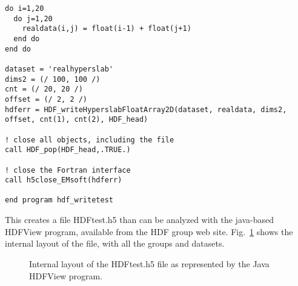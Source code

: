 \documentclass[DIV=calc, paper=letter, fontsize=11pt]{scrartcl}	 %
\begin{document}
{\begin{verbatim}
do i=1,20
  do j=1,20
    realdata(i,j) = float(i-1) + float(j+1)
  end do
end do

dataset = 'realhyperslab'
dims2 = (/ 100, 100 /)
cnt = (/ 20, 20 /)
offset = (/ 2, 2 /)
hdferr = HDF_writeHyperslabFloatArray2D(dataset, realdata, dims2, offset, cnt(1), cnt(2), HDF_head)

! close all objects, including the file
call HDF_pop(HDF_head,.TRUE.)

! close the Fortran interface
call h5close_EMsoft(hdferr)

end program hdf_writetest
\end{verbatim}}

This creates a file \textsf{HDFtest.h5} than can be analyzed with the java-based \textsf{HDFView} program, available
from the HDF group web site.  Fig.~\ref{fig:HDFView} shows the internal layout of the file, with all the groups and
datasets.

\begin{figure}[h]
\leavevmode\centering
\epsfysize=6in
\caption{\label{fig:HDFView}Internal layout of the \textsf{HDFtest.h5} file as represented by the Java \textsf{HDFView} program.}
\end{figure}
\end{document}
